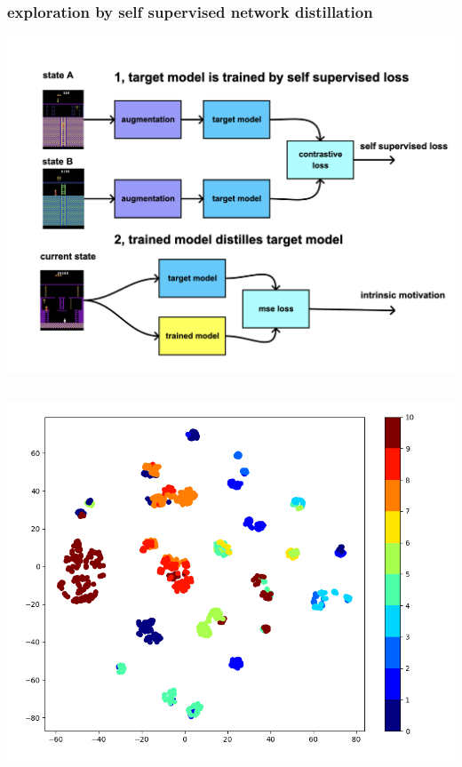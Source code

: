 \documentclass{beamer}
\begin{document}
\begin{frame}
  
  \frametitle{exploration by self supervised network distillation}

  \centering
  \includegraphics[scale=0.07]{../diagrams/cnd/overview.png}
  \bigskip
  \begin{columns}

    \begin{column}{0.5\textwidth}
      \centering
      \includegraphics[scale=0.2]{../images/rnd_features.png}
    \end{column}


\end{columns}
\end{frame}
\end{document}
